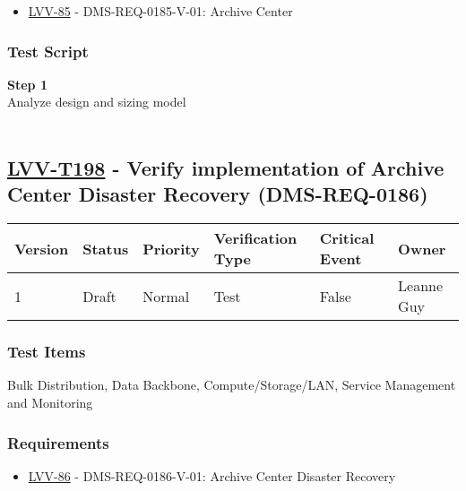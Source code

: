\begin{itemize}
\tightlist
\item
  \href{https://jira.lsstcorp.org/browse/LVV-85}{LVV-85} -
  DMS-REQ-0185-V-01: Archive Center
\end{itemize}

\hypertarget{test-script-174}{%
\subsubsection{Test Script}\label{test-script-174}}

\textbf{Step 1}\\
Analyze design and sizing model\\
~\\

\hypertarget{lvv-t198---verify-implementation-of-archive-center-disaster-recovery-dms-req-0186}{%
\subsection{\texorpdfstring{\href{https://jira.lsstcorp.org/secure/Tests.jspa\#/testCase/LVV-T198}{LVV-T198}
- Verify implementation of Archive Center Disaster Recovery
(DMS-REQ-0186)}{LVV-T198 - Verify implementation of Archive Center Disaster Recovery (DMS-REQ-0186)}}\label{lvv-t198---verify-implementation-of-archive-center-disaster-recovery-dms-req-0186}}

\begin{longtable}[]{@{}llllll@{}}
\toprule
Version & Status & Priority & Verification Type & Critical Event &
Owner\tabularnewline
\midrule
\endhead
1 & Draft & Normal & Test & False & Leanne Guy\tabularnewline
\bottomrule
\end{longtable}

\hypertarget{test-items-174}{%
\subsubsection{Test Items}\label{test-items-174}}

Bulk Distribution, Data Backbone, Compute/Storage/LAN, Service
Management and Monitoring~

\hypertarget{requirements-175}{%
\subsubsection{Requirements}\label{requirements-175}}

\begin{itemize}
\tightlist
\item
  \href{https://jira.lsstcorp.org/browse/LVV-86}{LVV-86} -
  DMS-REQ-0186-V-01: Archive Center Disaster Recovery
\end{itemize}


